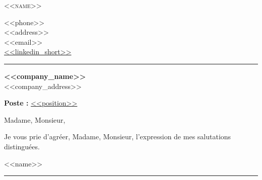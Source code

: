 \documentclass[11pt, a4paper]{article}
\begin{document}
\raggedbottom

\begin{minipage}[t]{0.55\textwidth}
    \vspace*{0pt}
    \textsc{{\Huge <<name>>}}
\end{minipage}\hfill
\begin{minipage}[t]{0.35\textwidth}
    \setlength{\baselineskip}{15pt}
    \RaggedLeft
    \faMobile{} <<phone>>\\
    \faHome{} <<address>>\\
    \faEnvelope{} <<email>>\\
    \faLinkedinSquare{} \href{https://<<linkedin>>}{<<linkedin_short>>}
\end{minipage}

\vspace{4pt}
{\color{cvteal} \rule{\linewidth}{1mm}}
\vspace{6pt}

\textbf{<<company_name>>}\\
<<company_address>>

\vspace{6pt}

\begin{center}
    \textbf{Poste :} \underline{<<position>>}
\end{center}

Madame, Monsieur,

\setlength{\baselineskip}{16pt}

\vspace{14pt}

Je vous prie d'agr\'eer, Madame, Monsieur, l'expression de mes salutations distingu\'ees.

\vspace{24pt}

<<name>>

\vspace*{\fill}
{\color{cvteal} \rule{\linewidth}{1mm}}
\end{document}
